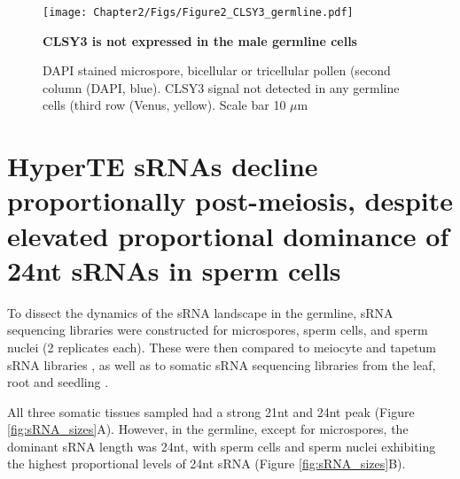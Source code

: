 \begin{figure}[htbp!] 
\centering    
    \texttt{[image: Chapter2/Figs/Figure2\_CLSY3\_germline.pdf]}
\caption{\textbf{CLSY3 is not expressed in the male germline cells}}
\label{fig:CLSY3_germ}
\captionsetup{font=small}
    \caption*{DAPI stained microspore, bicellular or tricellular pollen (second column (DAPI, blue). CLSY3 signal not detected in any germline cells (third row (Venus, yellow). Scale bar 10 $\mu$m}
\end{figure}


\section{HyperTE sRNAs decline proportionally post-meiosis, despite elevated proportional dominance of 24nt sRNAs in sperm cells}

To dissect the dynamics of the sRNA landscape in the germline, sRNA sequencing libraries were constructed for microspores, sperm cells, and sperm nuclei (2 replicates each). These were then compared to meiocyte and tapetum sRNA libraries \citep{RN187}, as well as to somatic sRNA sequencing libraries from the leaf, root and seedling \citep{RN262,RN263,RN264}. 

All three somatic tissues sampled had a strong 21nt and 24nt peak (Figure \ref{fig:sRNA_sizes}A). However, in the germline, except for microspores, the dominant sRNA length was 24nt, with sperm cells and sperm nuclei exhibiting the highest proportional levels of 24nt sRNA (Figure \ref{fig:sRNA_sizes}B).

